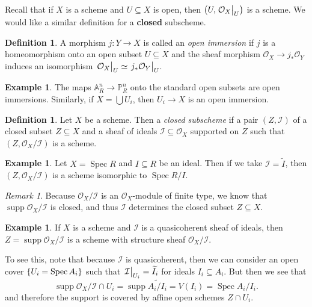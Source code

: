 \documentclass[leqno, openany]{memoir}
\theoremstyle{definition}
\newtheorem{defn}[thm]{Definition}
\newtheorem{exm}[thm]{Example}
\theoremstyle{remark}
\newtheorem{rmk}[thm]{Remark}
\theoremstyle{plain}
\theoremstyle{definition}
\theoremstyle{remark}
\newcommand{\A}{\mathbb{A}}
\renewcommand{\P}{\mathbb{P}}
\newcommand{\mc}[1]{\mathcal{#1}}
\newcommand{\wt}[1]{\widetilde{#1}}
\DeclareMathOperator{\supp}{supp}
\DeclareMathOperator{\Spec}{Spec}
\begin{document}
Recall that if $X$ is a scheme and $U \subseteq X$ is open, then $\qty(U,
\eval{\mc{O}_X}_U)$ is a scheme. We would like a similar definition for a
\textbf{closed} subscheme.

\begin{defn} A morphism $j \colon Y \to X$ is called an \textit{open immersion}
    if $j$ is a homeomorphism onto an open subset $U \subseteq X$ and the sheaf
    morphism $\mc{O}_X \to j_* \mc{O}_Y$ induces an isomorphism
    $\eval{\mc{O}_X}_U \simeq \eval{j_* \mc{O}_Y}_U$.  \end{defn}

\begin{exm} The maps $\A^n_R \to \P^n_R$ onto the standard open subsets are
open immersions. Similarly, if $X = \bigcup U_i$, then $U_i \to X$ is an open
immersion.  \end{exm}

\begin{defn} Let $X$ be a scheme. Then a \textit{closed subscheme} if a pair
    $(Z, \mc{I})$ of a closed subset $Z \subseteq X$ and a sheaf of ideals
    $\mc{I} \subseteq \mc{O}_X$ supported on $Z$ such that $(Z, \mc{O}_X /
    \mc{I})$ is a scheme.  \end{defn}

\begin{exm} Let $X = \Spec R$ and $I \subseteq R$ be an ideal. Then if we take
$\mc{I} = \wt{I}$, then $(Z, \mc{O}_X / \mc{I})$ is a scheme isomorphic to
$\Spec R/I$.  \end{exm}

\begin{rmk} Because $\mc{O}_X / \mc{I}$ is an $\mc{O}_X$-module of finite type,
we know that $\supp \mc{O}_X/\mc{I}$ is closed, and thus $\mc{I}$ determines
the closed subset $Z \subseteq X$.  \end{rmk}

\begin{exm} If $X$ is a scheme and $\mc{I}$ is a quasicoherent sheaf of ideals,
    then $Z = \supp \mc{O}_X / \mc{I}$ is a scheme with structure sheaf
    $\mc{O}_X/\mc{I}$.

    To see this, note that because $\mc{I}$ is quasicoherent, then we can
    consider an open cover $\qty{U_i = \Spec A_i}$ such that
    $\eval{\mc{I}}_{U_i} = \wt{I}_i$ for ideals $I_i \subseteq A_i$. But then
    we see that \[ \supp \mc{O}_X/\mc{I} \cap U_i = \supp \wt{A_i/I_i} = V(I_i)
    = \Spec A_i/I_i. \] and therefore the support is covered by affine open
schemes $Z \cap U_i$.  \end{exm}
\end{document}
